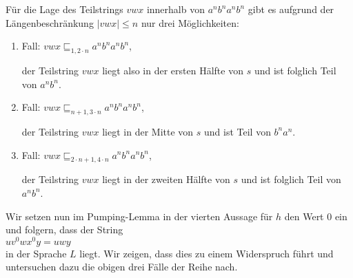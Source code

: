 F\"ur die Lage des Teilstrings $vwx$ innerhalb von $a^{n}b^{n}a^{n}b^{n}$ gibt es aufgrund
der L\"angenbeschr\"ankung $|vwx| \leq n$ nur drei M\"oglichkeiten:
\begin{enumerate}
\item Fall: \quad $vwx \sqsubseteq_{1,2\cdot n} a^{n}b^{n}a^{n}b^{n}$,  

      der Teilstring
      $vwx$ liegt also in der ersten H\"alfte von $s$ und ist folglich Teil von
      $a^{n}b^{n}$.
\item Fall: \quad $vwx \sqsubseteq_{n+1,3\cdot n} a^{n}b^{n}a^{n}b^{n}$,  

      der Teilstring
      $vwx$ liegt in der Mitte von $s$ und ist Teil von $b^{n}a^{n}$.
\item Fall: \quad $vwx \sqsubseteq_{2\cdot n+1, 4 \cdot n} a^{n}b^{n}a^{n}b^{n}$,  
  
      der Teilstring
      $vwx$ liegt in der zweiten H\"alfte von $s$ und ist folglich Teil von
      $a^{n}b^{n}$.
\end{enumerate}
Wir setzen nun im Pumping-Lemma in der vierten Aussage f\"ur $h$ den Wert $0$ ein und folgern, dass der
String 
\\[0.2cm]
\hspace*{1.3cm}
$uv^0wx^0y = uwy$ 
\\[0.2cm]
in der Sprache $L$ liegt.  Wir zeigen, dass dies zu einem Widerspruch
f\"uhrt und untersuchen dazu die obigen drei F\"alle der Reihe nach.
